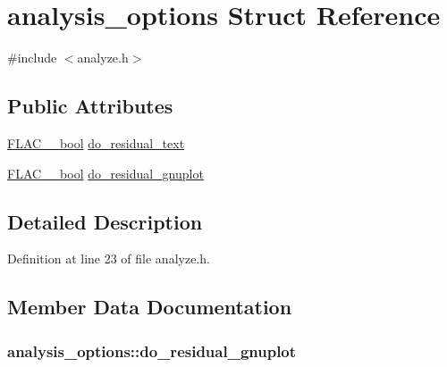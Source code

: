 \hypertarget{structanalysis__options}{}\section{analysis\+\_\+options Struct Reference}
\label{structanalysis__options}


{\ttfamily \#include $<$analyze.\+h$>$}

\subsection*{Public Attributes}
\begin{DoxyCompactItemize}
\item 
\hyperlink{ordinals_8h_a95103469f1cbd78b8cf250194985b34e}{F\+L\+A\+C\+\_\+\+\_\+bool} \hyperlink{structanalysis__options_abc70e0a062f8f24f407826a40bcbbf33}{do\+\_\+residual\+\_\+text}
\item 
\hyperlink{ordinals_8h_a95103469f1cbd78b8cf250194985b34e}{F\+L\+A\+C\+\_\+\+\_\+bool} \hyperlink{structanalysis__options_ad77d0f904f868627dfee4355f1487845}{do\+\_\+residual\+\_\+gnuplot}
\end{DoxyCompactItemize}


\subsection{Detailed Description}


Definition at line 23 of file analyze.\+h.



\subsection{Member Data Documentation}
\subsubsection[{\texorpdfstring{do\+\_\+residual\+\_\+gnuplot}{do_residual_gnuplot}}]{ analysis\+\_\+options\+::do\+\_\+residual\+\_\+gnuplot}\hypertarget{structanalysis__options_ad77d0f904f868627dfee4355f1487845}{}\label{structanalysis__options_ad77d0f904f868627dfee4355f1487845}


